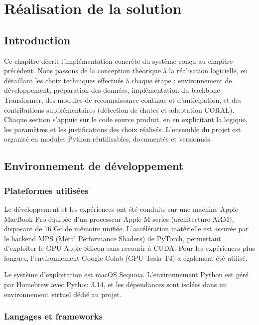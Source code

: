 \chapter{Réalisation de la solution}
\label{ch:10-Realisation}

\section{Introduction}

Ce chapitre décrit l'implémentation concrète du système conçu au chapitre précédent. Nous passons de la conception théorique à la réalisation logicielle, en détaillant les choix techniques effectués à chaque étape : environnement de développement, préparation des données, implémentation du backbone Transformer, des modules de reconnaissance continue et d'anticipation, et des contributions supplémentaires (détection de chutes et adaptation CORAL). Chaque section s'appuie sur le code source produit, en en explicitant la logique, les paramètres et les justifications des choix réalisés. L'ensemble du projet est organisé en modules Python réutilisables, documentés et versionnés.

\section{Environnement de développement}

\subsection{Plateformes utilisées}

Le développement et les expériences ont été conduits sur une machine Apple MacBook Pro équipée d'un processeur Apple M-series (architecture ARM), disposant de 16 Go de mémoire unifiée. L'accélération matérielle est assurée par le backend MPS (Metal Performance Shaders) de PyTorch, permettant d'exploiter le GPU Apple Silicon sans recourir à CUDA. Pour les expériences plus longues, l'environnement Google Colab (GPU Tesla T4) a également été utilisé.

Le système d'exploitation est macOS Sequoia. L'environnement Python est géré par Homebrew avec Python 3.14, et les dépendances sont isolées dans un environnement virtuel dédié au projet.

\subsection{Langages et frameworks}

